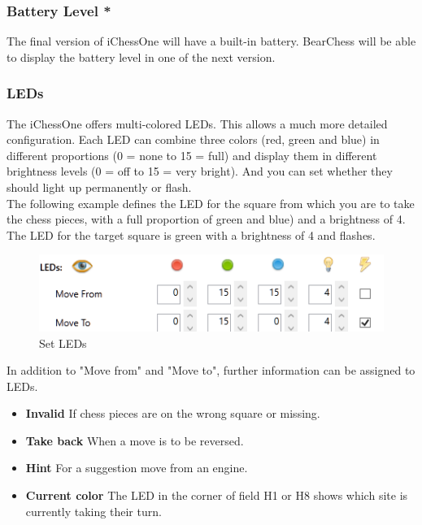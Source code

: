 \documentclass[11pt,a4paper]{article}
\begin{document}
\subsubsection{Battery Level {\color{red}\textbf{*}} }
 
The final version of iChessOne will have a built-in battery. BearChess will be able to display the battery level in one of the next version.

\subsubsection{LEDs}

The iChessOne offers multi-colored LEDs. This allows a much more detailed configuration. Each LED can combine three colors ({\color{red}red}, {\color{ForestGreen}green} and {\color{blue}blue}) in different proportions (0 = none to 15 = full) and display them in different brightness levels (0 = off to 15 = very bright).
And you can set whether they should light up permanently or flash.\\
The following example defines the LED for the square from which you are to take the chess pieces, with a full proportion of  {\color{ForestGreen}green} and {\color{blue}blue}) and a brightness of 4.
The LED for the target square is {\color{ForestGreen}green} with a brightness of 4 and flashes.

\begin{figure}[H]
	\centering
	\includegraphics[scale=1.0]{iChessOne3.png}
	\caption{Set LEDs }
	\label{fig:iChessOne6}
\end{figure}
In addition to "Move from" and "Move to", further information can be assigned to LEDs.
\begin{itemize}
	\item \textbf{Invalid} If chess pieces are on the wrong square or missing.
	\item \textbf{Take back} When a move is to be reversed.
    \item \textbf{Hint} For a suggestion move from an engine.
    \item \textbf{Current color} The LED in the corner of field H1 or H8 shows which site is currently taking their turn.	       
\end{itemize}
\end{document}
